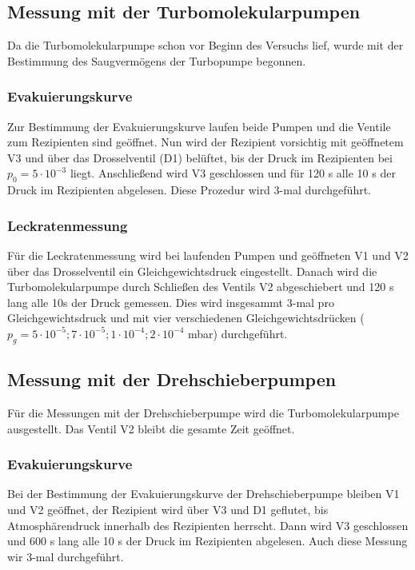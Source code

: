 \subsection{Messung mit der Turbomolekularpumpen}
\label{sec:Turbomolekularpumpen Messungen}
Da die Turbomolekularpumpe schon vor Beginn des Versuchs lief, wurde mit der Bestimmung des Saugvermögens der Turbopumpe begonnen.

\subsubsection{Evakuierungskurve}
\label{sec:Evakuierungskurve1}
Zur Bestimmung der Evakuierungskurve laufen beide Pumpen und die Ventile zum Rezipienten sind geöffnet.
Nun wird der Rezipient vorsichtig mit geöffnetem V3 und über das Drosselventil (D1) belüftet, bis der Druck im Rezipienten bei $p_0 = 5 \cdot 10^{-3}$ liegt.
Anschließend wird V3 geschlossen und für 120 s alle 10 s der Druck im Rezipienten abgelesen.
Diese Prozedur wird 3-mal durchgeführt.

\subsubsection{Leckratenmessung}
\label{sec:Leckratenmessung1}
Für die Leckratenmessung wird bei laufenden Pumpen und geöffneten V1 und V2 über das Drosselventil ein Gleichgewichtsdruck eingestellt.
Danach wird die Turbomolekularpumpe durch Schließen des Ventils V2 abgeschiebert und 120 s lang alle 10s der Druck gemessen.
Dies wird insgesammt 3-mal pro Gleichgewichtsdruck und mit vier verschiedenen Gleichgewichtsdrücken ($p_g = 5 \cdot 10^{-5}; 7 \cdot 10^{-5}; 1 \cdot 10^{-4}; 2 \cdot 10^{-4}$ mbar) durchgeführt.

\subsection{Messung mit der Drehschieberpumpen}
\label{sec:Drehschieberpumpen Messungen}
Für die Messungen mit der Drehschieberpumpe wird die Turbomolekularpumpe ausgestellt. Das Ventil V2 bleibt die gesamte Zeit geöffnet.

\subsubsection{Evakuierungskurve}
\label{sec:Evakuierungskurve2}
Bei der Bestimmung der Evakuierungskurve der Drehschieberpumpe bleiben V1 und V2 geöffnet, der Rezipient wird über V3 und D1 geflutet, 
bis Atmosphärendruck innerhalb des Rezipienten herrscht. Dann wird V3 geschlossen und 600 s lang alle 10 s der Druck im Rezipienten abgelesen.
Auch diese Messung wir 3-mal durchgeführt.

